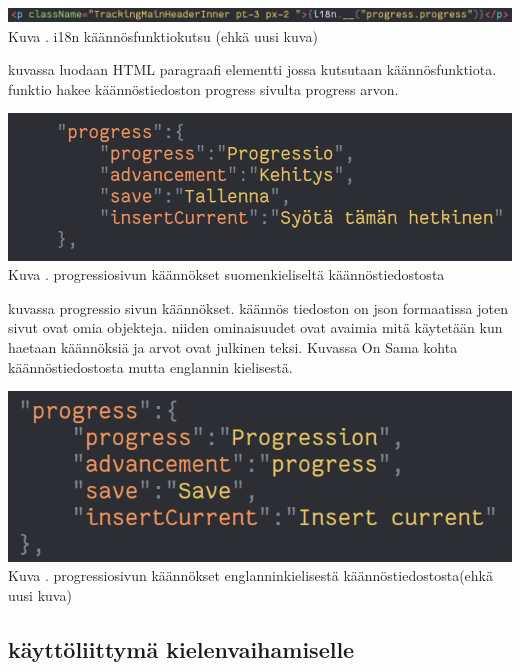 \documentclass[11pt,a4paper,titlepage,oneside]{article}
\begin{document}
\includegraphics[width = 15cm]{src/public/oppar/translationcall.png}\\
Kuva \getImgCount. {} i18n käännösfunktiokutsu (ehkä uusi kuva)
\medskip

kuvassa luodaan HTML paragraafi elementti jossa kutsutaan käännösfunktiota. funktio hakee käännöstiedoston progress sivulta progress arvon.
\bigskip

\includegraphics[width = 15cm]{src/public/oppar/translationfile.png}\\
Kuva \getImgCount. {} progressiosivun käännökset suomenkieliseltä käännöstiedostosta
\medskip

kuvassa progressio sivun käännökset. käännös tiedoston on json formaatissa joten sivut ovat omia objekteja. 
niiden ominaisuudet ovat avaimia mitä käytetään kun haetaan käännöksiä ja arvot ovat julkinen teksi.
Kuvassa \nextImageCount {} On Sama kohta käännöstiedostosta mutta englannin kielisestä.
\bigskip


\includegraphics[width = 15cm]{src/public/oppar/translationfileEng.png}\\
Kuva \getImgCount {}. progressiosivun käännökset englanninkielisestä käännöstiedostosta(ehkä uusi kuva)
\medskip




\subsection{käyttöliittymä kielenvaihamiselle}
\end{document}
